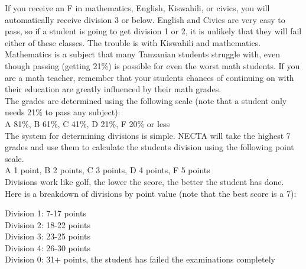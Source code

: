       If you receive an F in mathematics, English, Kiswahili, or civics, you will automatically receive division 3 or below.  English and Civics are very easy to pass, so if a student is going to get division 1 or 2, it is unlikely that they will fail either of these classes.  The trouble is with Kiswahili and mathematics.  Mathematics is a subject that many Tanzanian students struggle with, even though passing (getting 21\%) is possible for even the worst math students.  If you are a math teacher, remember that your students chances of continuing on with their education are greatly influenced by their math grades. \\
      The grades are determined using the following scale (note that a student only needs 21\% to pass any subject):\\

      A 81\%, B 61\%, C 41\%, D 21\%, F 20\% or less\\
      
      The system for determining divisions is simple.  NECTA will take the highest 7 grades and use them to calculate the students division using the following point scale. \\

      A 1 point,  B 2 points, C 3 points, D 4 points, F 5 points \\

      Divisions work like golf, the lower the score, the better the student has done.  Here is a breakdown of divisions by point value (note that the best score is a 7): \\
\begin{flushleft}
Division 1: 7-17 points\\
Division 2: 18-22 points\\
Division 3: 23-25 points\\
Division 4: 26-30 points\\
Division 0: 31+ points, the student has failed the examinations completely\\
\end{flushleft}
 
